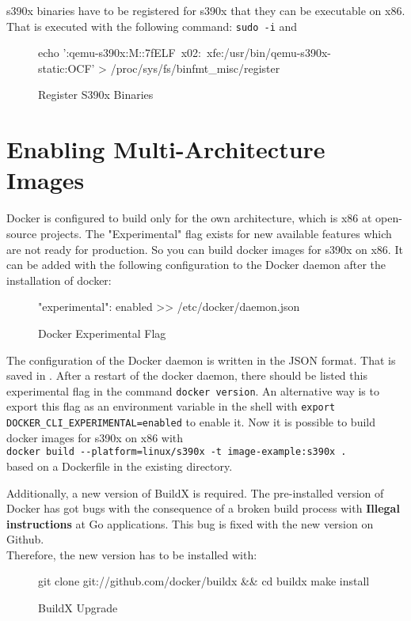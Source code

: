 s390x binaries have to be registered for s390x that they can be executable on x86. That is executed with the following command: \lstinline!sudo -i! and 
\begin{figure}[H]
\centering
\begin{boxedverbatim}
echo ':qemu-s390x:M::\x7fELF\
x02:\xff\xff\xff\xff\xff\xff\xff{}\xff\xff\xff\xff\xff\xff\xff\xff\xff\
xfe\xff\xff:/usr/bin/qemu-s390x-static:OCF' > /proc/sys/fs/binfmt_misc/register
\end{boxedverbatim}
 \caption{Register S390x Binaries}
    \label{RegisterS390xBinaries}
\end{figure}

\section{Enabling Multi-Architecture Images}\label{Multi-Architecture-Images}

Docker is configured to build only for the own architecture, which is x86 at open-source projects. The "Experimental" flag exists for new available features which are not ready for production. So you can build docker images for s390x on x86. It can be added with the following configuration to the Docker daemon after the installation of docker:
\begin{figure}[H]
\centering
\begin{boxedverbatim}
{
  "experimental": enabled
} >> /etc/docker/daemon.json
\end{boxedverbatim}
 \caption{Docker Experimental Flag}
    \label{DockerExperimentalFlag}
\end{figure}
The configuration of the Docker daemon is written in the JSON format. That is saved in .
After a restart of the docker daemon, there should be listed this experimental flag in the command  \lstinline!docker version!. An alternative way is to export this flag as an environment variable in the shell with  \lstinline!export DOCKER_CLI_EXPERIMENTAL=enabled! to enable it. Now it is possible to build docker images for s390x on x86 with \\ \lstinline!docker build --platform=linux/s390x -t image-example:s390x .! \\
based on a Dockerfile in the existing directory.

 
Additionally, a new version of BuildX is required. The pre-installed version of Docker has got bugs with the consequence of a broken build process with \textbf{Illegal instructions} at Go applications. This bug is fixed with the new version on Github. \\
Therefore, the new version has to be installed with:
\begin{figure}[H]
\centering
\begin{boxedverbatim}
git clone git://github.com/docker/buildx && cd buildx
make install
\end{boxedverbatim}
 \caption{BuildX Upgrade}
    \label{BuildXUpgrade}
\end{figure}
 

